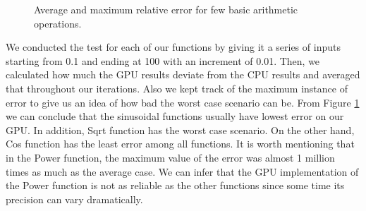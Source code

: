\begin{figure}[!tbh]
 \centering  
  \caption{Average and maximum relative error for few basic arithmetic operations.}
   \label{fig:histogram_comparison}
\end{figure} 

We conducted the test for each of our functions by giving it a series of inputs starting from 0.1 and ending at 100 with an increment of 0.01. Then, we calculated how much the GPU results deviate from the CPU results and averaged that throughout our iterations. Also we kept track of the maximum instance of error to give us an idea of how bad the worst case scenario can be. From Figure \ref{fig:histogram_comparison} we can conclude that the sinusoidal functions usually have lowest error on our GPU. In addition, Sqrt function has the worst case scenario. On the other hand, Cos function has the least error among all functions. It is worth mentioning that in the Power function, the maximum value of the error was almost 1 million times as much as the average case. We can infer that the GPU implementation of the Power function is not as reliable as the other functions since some time its precision can vary dramatically.

